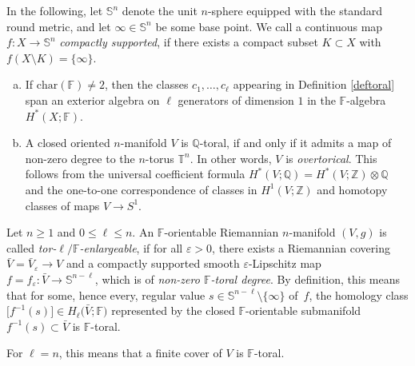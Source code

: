 \documentclass[pdftex]{sigma}
\numberwithin{equation}{section}
\newcommand{\F}{\mathbb{F}}
\newcommand{\SSS}{\mathbb{S}}
\newcommand{\TTT}{\mathbb{T}}
\newcommand{\charac}{\mathrm{char}}
\begin{document}
In the following, let $\SSS^n$ denote the unit $n$-sphere equipped with the standard round metric, and let $\infty \in \SSS^n$ be some base point.
We call a continuous map $f \colon X \to \SSS^n$ {\em compactly supported}, if there exists a compact subset $K \subset X$ with $f(X \setminus K) = \{ \infty\}$.

\begin{Remark} \label{rem:bemerkung}\quad
\begin{enumerate}[(a)]\itemsep=0pt
\item If $\charac(\F) \neq 2$, then the classes $c_1, \ldots, c_\ell$ appearing in Definition \ref{deftoral} span an exterior algebra on $\ell$ generators of dimension $1$ in the $\F$-algebra $H^*(X ; \F)$.
\item \label{overtorical} A closed oriented $n$-manifold $V$ is $\mathbb{Q}$-toral, if and only if it admits a map of non-zero degree to the $n$-torus $\TTT^n$.
In other words, $V$ is {\em overtorical}.
This follows from the universal coefficient formula $H^*(V; \mathbb{Q}) = H^*(V; \mathbb{Z}) \otimes \mathbb{Q}$ and the one-to-one correspondence of classes in $H^1(V; \mathbb{Z})$ and homotopy classes of maps $V \to S^1$.
\end{enumerate}
\end{Remark}


\begin{Definition} \label{def:enlargeable} Let $n \geq 1$ and $0 \leq \ell \leq n$.
An $\F$-orientable Riemannian $n$-manifold $(V,g)$ is called {\it tor-$\ell/\mathbb F$-enlargeable}, if for all $\varepsilon > 0$, there exists a Riemannian covering
$
 \bar V = \bar V_\varepsilon \to V
$
and a compactly supported smooth $\varepsilon$-Lipschitz map
$
 f = f_\varepsilon \colon \bar V \to \SSS^{n-\ell}
$,
which is of {\em non-zero $\F$-toral degree}.
By definition, this means that for some, hence every, regular value ${s \in \SSS^{n - \ell} \setminus \{\infty\}}$ of~$f$, the homology class $\big[f^{-1}(s)\big] \in H_{\ell}\big(\bar V; \F\big)$ represented by the closed $\F$-orientable submanifold~${f^{-1}(s) \subset \bar V}$ is $\F$-toral.

For $\ell = n$, this means that a finite cover of $V$ is $\F$-toral.
\end{Definition}
\end{document}

